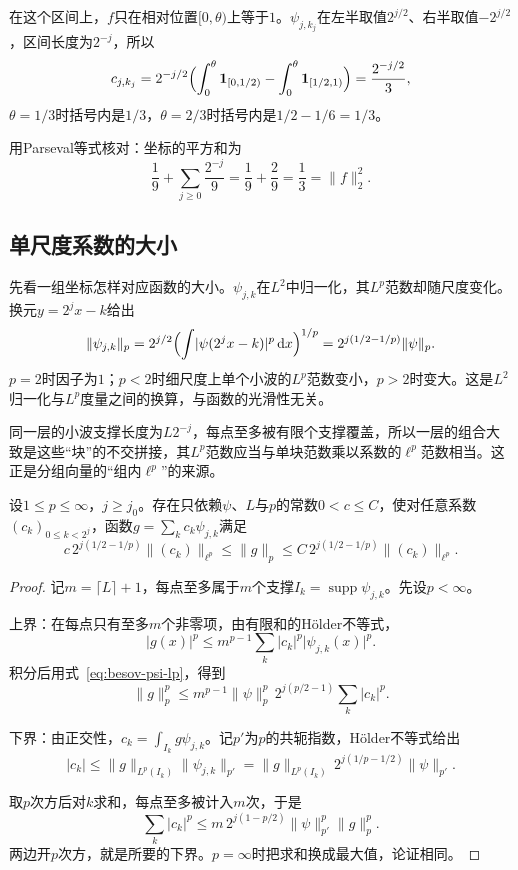 在这个区间上，$f$只在相对位置$[0,\theta)$上等于$1$。$\psi_{j,k_j}$在左半取值$2^{j/2}$、右半取值$-2^{j/2}$，区间长度为$2^{-j}$，所以
\[
 c_{j,k_j}=2^{-j/2}\Bigl(\int_0^\theta\mathbf 1_{[0,1/2)}-\int_0^\theta\mathbf 1_{[1/2,1)}\Bigr)=\frac{2^{-j/2}}{3},
\]
$\theta=1/3$时括号内是$1/3$，$\theta=2/3$时括号内是$1/2-1/6=1/3$。

用Parseval等式核对：坐标的平方和为
\[
 \frac19+\sum_{j\geq0}\frac{2^{-j}}{9}=\frac19+\frac29=\frac13=\lVert f\rVert_2^2 .
\]

\subsection{单尺度系数的大小}
\label{sec:besov-single-scale}

先看一组坐标怎样对应函数的大小。$\psi_{j,k}$在$L^2$中归一化，其$L^p$范数却随尺度变化。换元$y=2^jx-k$给出
\begin{equation}
 \lVert\psi_{j,k}\rVert_p=2^{j/2}\Bigl(\int\lvert\psi(2^jx-k)\rvert^p\,\mathrm dx\Bigr)^{1/p}=2^{j(1/2-1/p)}\lVert\psi\rVert_p .
 \label{eq:besov-psi-lp}
\end{equation}
$p=2$时因子为$1$；$p<2$时细尺度上单个小波的$L^p$范数变小，$p>2$时变大。这是$L^2$归一化与$L^p$度量之间的换算，与函数的光滑性无关。

同一层的小波支撑长度为$L2^{-j}$，每点至多被有限个支撑覆盖，所以一层的组合大致是这些“块”的不交拼接，其$L^p$范数应当与单块范数乘以系数的$\ell^p$范数相当。这正是分组向量的“组内$\ell^p$”的来源。

\begin{lemma}[单层组合的$L^p$大小]
\label{lem:besov-single-level}
设$1\leq p\leq\infty$，$j\geq j_0$。存在只依赖$\psi$、$L$与$p$的常数$0<c\leq C$，使对任意系数$(c_k)_{0\leq k<2^j}$，函数$g=\sum_kc_k\psi_{j,k}$满足
\begin{equation}
 c\,2^{j(1/2-1/p)}\lVert(c_k)\rVert_{\ell^p}\leq\lVert g\rVert_p\leq C\,2^{j(1/2-1/p)}\lVert(c_k)\rVert_{\ell^p} .
 \label{eq:besov-single-level}
\end{equation}
\end{lemma}

\begin{proof}
记$m=\lceil L\rceil+1$，每点至多属于$m$个支撑$I_k=\operatorname{supp}\psi_{j,k}$。先设$p<\infty$。

上界：在每点只有至多$m$个非零项，由有限和的Hölder不等式，
\[
 \lvert g(x)\rvert^p\leq m^{p-1}\sum_k\lvert c_k\rvert^p\lvert\psi_{j,k}(x)\rvert^p .
\]
积分后用式~\eqref{eq:besov-psi-lp}，得到
\[
 \lVert g\rVert_p^p\leq m^{p-1}\lVert\psi\rVert_p^p\,2^{j(p/2-1)}\sum_k\lvert c_k\rvert^p .
\]

下界：由正交性，$c_k=\int_{I_k}g\psi_{j,k}$。记$p'$为$p$的共轭指数，Hölder不等式给出
\[
 \lvert c_k\rvert\leq\lVert g\rVert_{L^p(I_k)}\lVert\psi_{j,k}\rVert_{p'}=\lVert g\rVert_{L^p(I_k)}\,2^{j(1/p-1/2)}\lVert\psi\rVert_{p'}.
\]

取$p$次方后对$k$求和，每点至多被计入$m$次，于是
\[
 \sum_k\lvert c_k\rvert^p\leq m\,2^{j(1-p/2)}\lVert\psi\rVert_{p'}^p\lVert g\rVert_p^p.
\]
两边开$p$次方，就是所要的下界。$p=\infty$时把求和换成最大值，论证相同。
\end{proof}

